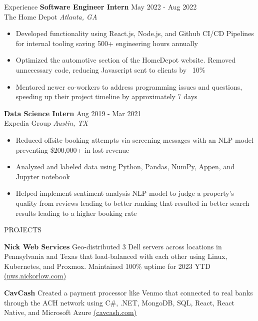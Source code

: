 \documentclass{resume} %
\begin{document}
\begin{rSection}{Experience}
\textbf{Software Engineer Intern} \hfill May 2022 - Aug 2022\\
The Home Depot \hfill \textit{Atlanta, GA}
 \begin{itemize}
    \itemsep -3pt {} 
     \item Developed functionality using React.js, Node.js, and Github CI/CD Pipelines for internal tooling saving 500+ engineering hours annually
     \item Optimized the automotive section of the HomeDepot website. Removed unnecessary code, reducing Javascript sent to clients by ~10\%
    \item Mentored newer co-workers to address programming issues and questions, speeding up their project timeline by approximately 7 days
 \end{itemize}


 
\textbf{Data Science Intern} \hfill Aug 2019 - Mar 2021\\
Expedia Group \hfill \textit{Austin, TX}
 \begin{itemize}
    \itemsep -3pt {} 
     \item Reduced offsite booking attempts via screening messages with an NLP model preventing \$200,000+ in lost revenue
     \item Analyzed and labeled data using Python, Pandas, NumPy, Appen, and Jupyter notebook
    \item Helped implement sentiment analysis NLP model to judge a property’s quality from reviews leading to better ranking that resulted in better search results leading to a higher booking rate

 \end{itemize}

\end{rSection} 


\begin{rSection}{PROJECTS}
\vspace{-1.25em}
\item \textbf{Nick Web Services} {Geo-distributed 3 Dell servers across locations in Pennsylvania and Texas that load-balanced with each other using Linux, Kubernetes, and Proxmox. Maintained 100\% uptime for 2023 YTD \href{https://nws.nickorlow.com/}{(nws.nickorlow.com)}}
\item \textbf{CavCash} { Created a payment processor like Venmo that connected to real banks through the ACH network using  C\#, .NET, MongoDB, SQL, React, React Native, and Microsoft Azure \href{https://cavcash.com/}{(cavcash.com)}}
\end{rSection} 
\end{document}

